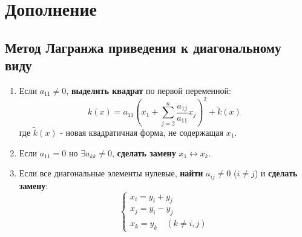 \section*{Дополнение}
\subsection*{Метод Лагранжа приведения к диагональному виду}
\label{Lagranj}
\begin{enumerate}
\item Если $a_{11} \neq 0$, \textbf{выделить квадрат} по первой переменной:
\[ k(x) = a_{11}\left(x_1 + \sum_{j=2}^n \frac{a_{1j}}{a_{11}}x_j\right)^2 + \tilde{k}(x) \]
где $\tilde{k}(x)$ - новая квадратичная форма, не содержащая $x_1$.

\item Если $a_{11} = 0$ но $\exists a_{kk} \neq 0$, \textbf{сделать замену} $x_1 \leftrightarrow x_k$.

\item Если все диагональные элементы нулевые, \textbf{найти} $a_{ij} \neq 0$ ($i \neq j$) и \textbf{сделать замену}:
\[
\begin{cases}
x_i = y_i + y_j \\
x_j = y_i - y_j \\
x_k = y_k \quad (k \neq i,j)
\end{cases}
\]
\end{enumerate}